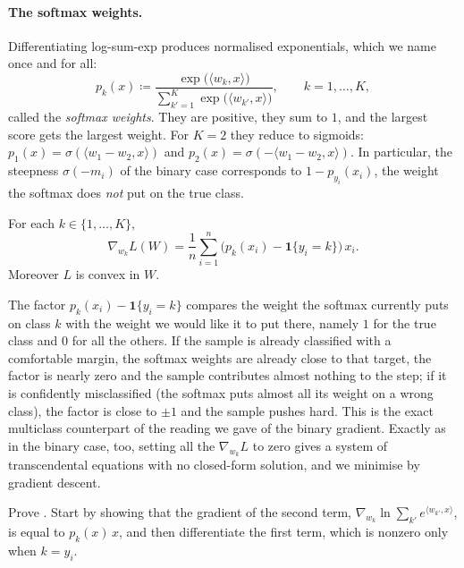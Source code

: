 \paragraph{The softmax weights.}
Differentiating log-sum-exp produces normalised exponentials, which we name once and
for all:
\[
p_k(x) \coloneqq \frac{\exp\big( \langle w_k, x \rangle \big)}{\sum_{k'=1}^K \exp\big( \langle w_{k'}, x \rangle \big)} ,
\qquad k = 1, \dots, K ,
\]
called the \emph{softmax weights}. They are positive, they sum to $1$, and the largest
score gets the largest weight. For $K = 2$ they reduce to sigmoids:
$p_1(x) = \sigma(\langle w_1 - w_2, x \rangle)$ and $p_2(x) = \sigma(-\langle w_1 - w_2,
x \rangle)$. In particular, the steepness $\sigma(-m_i)$ of the binary case corresponds to
$1 - p_{y_i}(x_i)$, the weight the softmax does \emph{not} put on the true class.

\begin{prop}
\label{prop:softmax-grad}
For each $k \in \{1, \dots, K\}$,
\[
\nabla_{w_k} L(W) = \frac{1}{n} \sum_{i=1}^n \Big( p_k(x_i) - \mathbf{1}\{ y_i = k \} \Big) \, x_i .
\]
Moreover $L$ is convex in $W$.
\end{prop}

The factor $p_k(x_i) - \mathbf{1}\{y_i = k\}$ compares the weight the
softmax currently puts on class $k$ with the weight we would like it to put there,
namely $1$ for the true class and $0$ for all the others. If the sample is already
classified with a comfortable margin, the softmax weights are already close to that
target, the factor is nearly zero and the sample contributes almost nothing to the
step; if it is confidently misclassified (the softmax puts almost all its weight on a
wrong class), the factor is close to $\pm 1$ and the sample pushes hard. This is the exact multiclass counterpart of the reading we gave of the binary
gradient. Exactly as in the binary case, too, setting all the $\nabla_{w_k} L$ to zero
gives a system of transcendental equations with no closed-form solution, and we
minimise by gradient descent.

\begin{exercise}[$\star\star$]
Prove . Start by showing that the gradient of the second term,
$\nabla_{w_k} \ln \sum_{k'} e^{\langle w_{k'}, x\rangle}$, is equal to $p_k(x)\, x$,
and then differentiate the first term, which is nonzero only when $k = y_i$.
\end{exercise}

